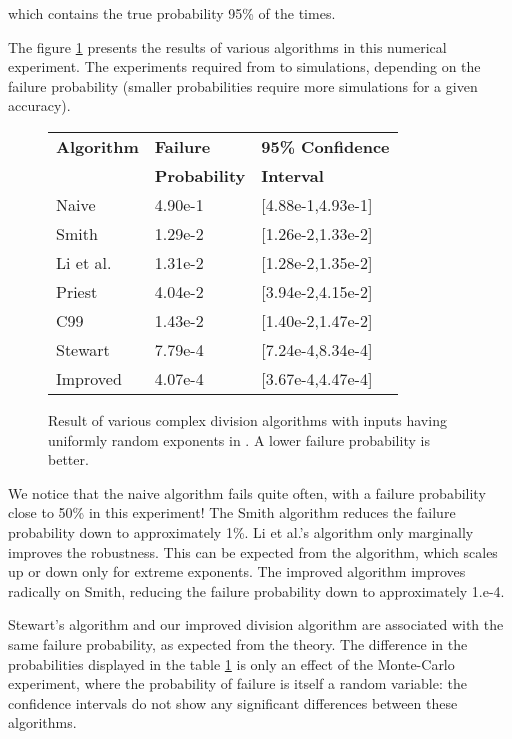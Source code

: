 \documentclass{paper}
\begin{document}
which contains the true probability 95\% of the times.

The figure \ref{fig-compdiv-varalgos} presents the results of 
various algorithms in this numerical experiment. 
The experiments required from  to 
 simulations, depending on the failure 
probability (smaller probabilities require more simulations for a 
given accuracy).

\begin{figure}
\caption{
Result of various complex division algorithms with 
inputs  having uniformly random exponents in . 
A lower failure probability is better. 
}
\label{fig-compdiv-varalgos}
\begin{center}
\begin{tabular}{l|l|l}
\bf{Algorithm} & \bf{Failure    } & \bf{95\% Confidence}\\
\bf{         } & \bf{Probability} & \bf{Interval} \\
\hline
Naive    & 4.90e-1 & [4.88e-1,4.93e-1] \\
Smith    & 1.29e-2 & [1.26e-2,1.33e-2] \\
Li et al.& 1.31e-2 & [1.28e-2,1.35e-2] \\
Priest   & 4.04e-2 & [3.94e-2,4.15e-2] \\
C99      & 1.43e-2 & [1.40e-2,1.47e-2] \\
Stewart  & 7.79e-4 & [7.24e-4,8.34e-4] \\
Improved & 4.07e-4 & [3.67e-4,4.47e-4] \\
\end{tabular}
\end{center}
\end{figure}

We notice that the naive algorithm fails quite often, with a failure probability close 
to 50\% in this experiment! 
The Smith algorithm reduces the failure probability down 
to approximately 1\%. 
Li et al.'s algorithm only marginally improves the robustness. 
This can be expected from the algorithm, which scales up or down 
only for extreme exponents. 
The improved algorithm improves radically on Smith, reducing the 
failure probability down to approximately 1.e-4. 

Stewart's algorithm and our improved division algorithm are 
associated with the same failure probability, as expected from 
the theory. 
The difference in the probabilities displayed in the 
table \ref{fig-compdiv-varalgos} is only an effect 
of the Monte-Carlo experiment, where the probability of failure is 
itself a random variable: the confidence intervals 
do not show any significant differences between these algorithms.
\end{document}
